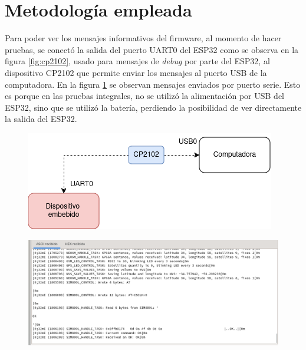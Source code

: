 \section{Metodología empleada}

Para poder ver los mensajes informativos del firmware, al momento de hacer pruebas, se conectó la salida del puerto UART0 del ESP32 como se observa en la figura \ref{fig:cp2102}, usado para mensajes de \textit{debug} por parte del ESP32\citep{UART:1}, al dispositivo CP2102 que permite enviar los mensajes al puerto USB de la computadora. En la figura \ref{fig:esp32:debug} se observan mensajes enviados por puerto serie. Esto es porque en las pruebas integrales, no se utilizó la alimentación por USB del ESP32, sino que se utilizó la batería, perdiendo la posibilidad de ver directamente la salida del ESP32.

\begin{figure}[H]
\centering
\begin{minipage}{.5\textwidth}
  \centering
  \includegraphics[width=0.9\linewidth]{./Figures/cp2102.png}
  \label{fig:cp2102}
\end{minipage}%
\begin{minipage}{.5\textwidth}
  \centering
  \includegraphics[width=0.9\linewidth]{./Figures/moserial-debug.png}
  \label{fig:esp32:debug}
\end{minipage}
\end{figure}

